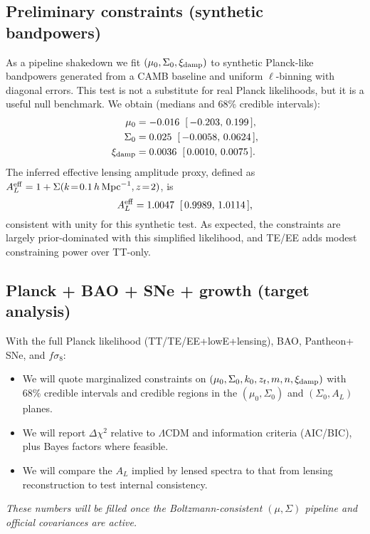 \label{sec:results}

\subsection{Preliminary constraints (synthetic bandpowers)}
As a pipeline shakedown we fit $(\mu_0,\Sigma_0,\xi_{\rm damp})$ to synthetic Planck-like bandpowers generated from a CAMB baseline and uniform $\ell$-binning with diagonal errors. This test is not a substitute for real Planck likelihoods, but it is a useful null benchmark. We obtain (medians and 68\% credible intervals):
\begin{align*}
\mu_0 &= -0.016 \;\;[\, -0.203,\, 0.199 \,],\\
\Sigma_0 &= 0.025 \;\;[\, -0.0058,\, 0.0624 \,],\\
\xi_{\rm damp} &= 0.0036 \;\;[\, 0.0010,\, 0.0075 \,].
\end{align*}
The inferred effective lensing amplitude proxy, defined as $A_L^{\rm eff}=1+\Sigma(k\!=\!0.1\,h\,{\rm Mpc}^{-1},z\!=\!2)$, is
\[
A_L^{\rm eff} = 1.0047 \;\;[\, 0.9989,\, 1.0114 \,],
\]
consistent with unity for this synthetic test. As expected, the constraints are largely prior-dominated with this simplified likelihood, and TE/EE adds modest constraining power over TT-only.

\subsection{Planck + BAO + SNe + growth (target analysis)}
With the full Planck likelihood (TT/TE/EE+lowE+lensing), BAO, Pantheon+ SNe, and $f\sigma_8$:
\begin{itemize}
  \item We will quote marginalized constraints on $(\mu_0,\Sigma_0,k_0,z_t,m,n,\xi_{\rm damp})$ with 68\% credible intervals and credible regions in the $(\mu_0,\Sigma_0)$ and $(\Sigma_0,A_L)$ planes. 
  \item We will report $\Delta\chi^2$ relative to $\Lambda$CDM and information criteria (AIC/BIC), plus Bayes factors where feasible.
  \item We will compare the $A_L$ implied by lensed spectra to that from lensing reconstruction to test internal consistency.
\end{itemize}
\emph{These numbers will be filled once the Boltzmann-consistent $(\mu,\Sigma)$ pipeline and official covariances are active.}
